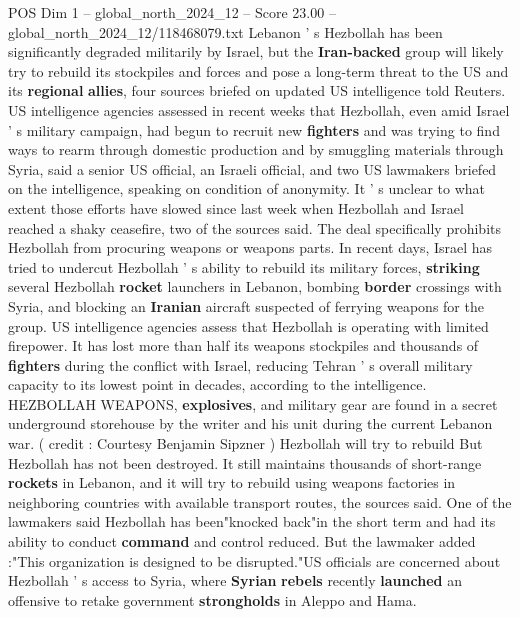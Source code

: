 \begin{textsample}{POS Dim 1 – global\_north\_2024\_12 – Score 23.00 – global\_north\_2024\_12/118468079.txt}  \label{ex:f1_pos_261}
Lebanon ' s Hezbollah has been significantly degraded militarily by Israel, but the \textbf{Iran-backed} group will likely try to rebuild its stockpiles and forces and pose a long-term threat to the US and its \textbf{regional} \textbf{allies}, four sources briefed on updated US intelligence told Reuters.
US intelligence agencies assessed in recent weeks that Hezbollah, even amid Israel ' s military campaign, had begun to recruit new \textbf{fighters} and was trying to find ways to rearm through domestic production and by smuggling materials through Syria, said a senior US official, an Israeli official, and two US lawmakers briefed on the intelligence, speaking on condition of anonymity.
It ' s unclear to what extent those efforts have slowed since last week when Hezbollah and Israel reached a shaky ceasefire, two of the sources said.
The deal specifically prohibits Hezbollah from procuring weapons or weapons parts.
In recent days, Israel has tried to undercut Hezbollah ' s ability to rebuild its military forces, \textbf{striking} several Hezbollah \textbf{rocket} launchers in Lebanon, bombing \textbf{border} crossings with Syria, and blocking an \textbf{Iranian} aircraft suspected of ferrying weapons for the group.
US intelligence agencies assess that Hezbollah is operating with limited firepower.
It has lost more than half its weapons stockpiles and thousands of \textbf{fighters} during the conflict with Israel, reducing Tehran ' s overall military capacity to its lowest point in decades, according to the intelligence.
HEZBOLLAH WEAPONS, \textbf{explosives}, and military gear are found in a secret underground storehouse by the writer and his unit during the current Lebanon war. ( credit : Courtesy Benjamin Sipzner ) Hezbollah will try to rebuild But Hezbollah has not been destroyed.
It still maintains thousands of short-range \textbf{rockets} in Lebanon, and it will try to rebuild using weapons factories in neighboring countries with available transport routes, the sources said.
One of the lawmakers said Hezbollah has been"knocked back"in the short term and had its ability to conduct \textbf{command} and control reduced.
But the lawmaker added :"This organization is designed to be disrupted."US officials are concerned about Hezbollah ' s access to Syria, where \textbf{Syrian} \textbf{rebels} recently \textbf{launched} an offensive to retake government \textbf{strongholds} in Aleppo and Hama.

\end{textsample}
